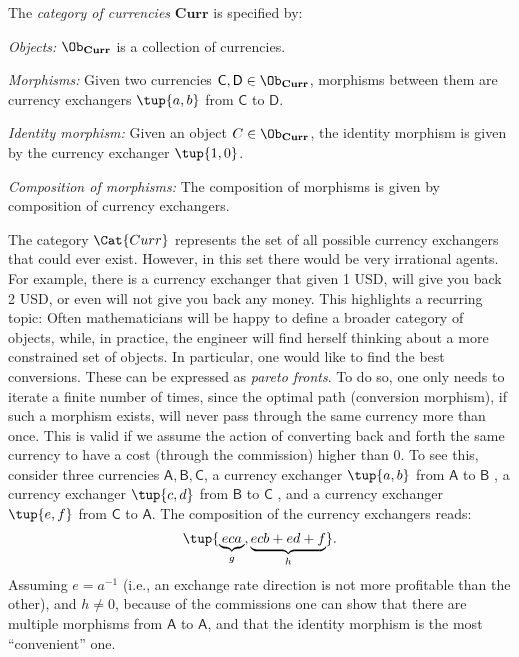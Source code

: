 \begin{definition}
    The \emph{category of currencies} $\mathbf{Curr}$ is specified by:
    \begin{compactenum}
        \item \emph{Objects:} $\Ob_\mathbf{Curr}$ is a collection of currencies.
        \item \emph{Morphisms:} Given two currencies $\mathsf{C},\mathsf{D}\in \Ob_{\mathbf{Curr}}$, morphisms between them are currency exchangers $\tup{a,b}$ from $\mathsf{C}$ to $\mathsf{D}$. 
        \item \emph{Identity morphism:} Given an object $C\in \Ob_\mathbf{Curr}$, the identity morphism is given by the currency exchanger $\tup{1,0}$.
        \item \emph{Composition of morphisms:} The composition of morphisms is given by composition of currency exchangers.
    \end{compactenum}
\end{definition}

The category $\Cat{Curr}$ represents the set of all possible currency exchangers that could
ever exist. However, in this set there would be very irrational agents. For example, there is a currency exchanger that given 1 USD, will give you back 2 USD, or even will not give you back any money. This highlights a recurring topic: Often mathematicians will be happy to define a broader category of objects, while, in practice, the engineer will find herself thinking about a more constrained set of objects. In particular, one would like to find the best conversions. These can be expressed as \emph{pareto fronts}. To do so, one only needs to iterate a finite number of times, since the optimal path (conversion morphism), if such a morphism exists, will never pass through the same currency more than once. This is valid if we assume the action of converting back and forth the same currency to have a cost (through the commission) higher than 0. To see this, consider three currencies $\mathsf{A,B,C}$, a currency exchanger $\tup{a,b}$ from $\mathsf{A}$ to $\mathsf{B}$ , a currency exchanger $\tup{c,d}$ from $\mathsf{B}$ to $\mathsf{C}$ , and a currency exchanger $\tup{e,f}$ from $\mathsf{C}$ to $\mathsf{A}$.  The composition of the currency exchangers reads:
\begin{equation}
\tup{\underbrace{eca}_{g}, \underbrace{ecb+ed+f}_{h}}.
\end{equation}
Assuming $e=a^{-1}$ (i.e., an exchange rate direction is not more profitable than the other), and $h\neq 0$, because of the commissions one can show that there are multiple morphisms from $\mathsf{A}$ to $\mathsf{A}$, and that the identity morphism is the most ``convenient'' one.




